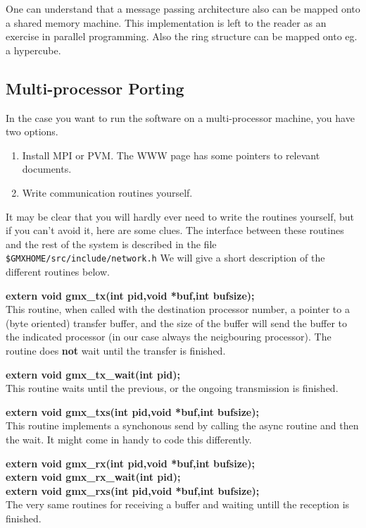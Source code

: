 One can understand that a message passing architecture also can be
mapped onto a shared memory machine. This implementation is left to
the reader as an exercise in parallel programming. Also the ring
structure can be mapped onto eg. a hypercube.

\subsection{Multi-processor Porting}

In the case you want to run the {\gromacs} software on a
multi-processor machine, you have two options.
\begin{enumerate}
\item	Install MPI or PVM. The {\gromacs} WWW page has some pointers
	to relevant documents.
\item	Write communication routines yourself. 
\end{enumerate}

It may be clear that you will hardly ever need to write the routines
yourself, but if you can't avoid it, here are some clues.
The interface between these routines and the
rest of the {\gromacs} system is described in the file {\tt
\$GMXHOME/src/include/network.h} We will give a short description of the
different routines below.

{\bf extern void gmx\_tx(int pid,void *buf,int bufsize);}\\ 

This routine, when called with the destination processor number, a
pointer to a (byte oriented) transfer buffer, and the size of the
buffer will send the buffer to the indicated processor (in our case
always the neigbouring processor). The routine does {\bf not} wait
until the transfer is finished.

\smallskip

{\bf extern void gmx\_tx\_wait(int pid);}\\
This routine waits until the previous, or the ongoing transmission is finished.

\smallskip


{\bf extern void gmx\_txs(int pid,void *buf,int bufsize);}\\
This routine implements a synchonous send by calling the async routine and then
the wait. It might come in handy to code this differently.

\smallskip

{\bf extern void gmx\_rx(int pid,void *buf,int bufsize);}\\
{\bf extern void gmx\_rx\_wait(int pid);}\\
{\bf extern void gmx\_rxs(int pid,void *buf,int bufsize);}\\
The very same routines for receiving a buffer and waiting untill the reception is finished.

